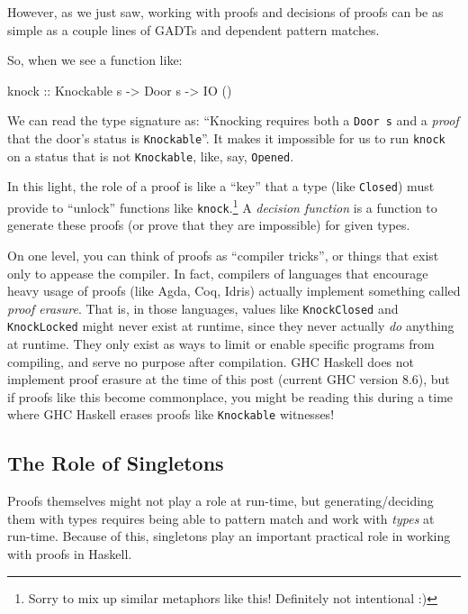 \documentclass[]{article}
\newenvironment{Shaded}{}{}
\newcommand{\DataTypeTok}[1]{\textcolor[rgb]{0.56,0.13,0.00}{#1}}
\newcommand{\NormalTok}[1]{#1}
\newcommand{\OtherTok}[1]{\textcolor[rgb]{0.00,0.44,0.13}{#1}}
\begin{document}
However, as we just saw, working with proofs and decisions of proofs can be as
simple as a couple lines of GADTs and dependent pattern matches.

So, when we see a function like:

\begin{Shaded}
\begin{Highlighting}[]
\OtherTok{knock ::} \DataTypeTok{Knockable}\NormalTok{ s }\OtherTok{->} \DataTypeTok{Door}\NormalTok{ s }\OtherTok{->} \DataTypeTok{IO}\NormalTok{ ()}
\end{Highlighting}
\end{Shaded}

We can read the type signature as: ``Knocking requires both a \texttt{Door\ s}
and a \emph{proof} that the door's status is \texttt{Knockable}''. It makes it
impossible for us to run \texttt{knock} on a status that is not
\texttt{Knockable}, like, say, \texttt{\textquotesingle{}Opened}.

In this light, the role of a proof is like a ``key'' that a type (like
\texttt{\textquotesingle{}Closed}) must provide to ``unlock'' functions like
\texttt{knock}.\footnote{Sorry to mix up similar metaphors like this! Definitely
  not intentional :)} A \emph{decision function} is a function to generate these
proofs (or prove that they are impossible) for given types.

On one level, you can think of proofs as ``compiler tricks'', or things that
exist only to appease the compiler. In fact, compilers of languages that
encourage heavy usage of proofs (like Agda, Coq, Idris) actually implement
something called \emph{proof erasure}. That is, in those languages, values like
\texttt{KnockClosed} and \texttt{KnockLocked} might never exist at runtime,
since they never actually \emph{do} anything at runtime. They only exist as ways
to limit or enable specific programs from compiling, and serve no purpose after
compilation. GHC Haskell does not implement proof erasure at the time of this
post (current GHC version 8.6), but if proofs like this become commonplace, you
might be reading this during a time where GHC Haskell erases proofs like
\texttt{Knockable} witnesses!

\hypertarget{the-role-of-singletons}{%
\subsection{The Role of Singletons}\label{the-role-of-singletons}}

Proofs themselves might not play a role at run-time, but generating/deciding
them with types requires being able to pattern match and work with \emph{types}
at run-time. Because of this, singletons play an important practical role in
working with proofs in Haskell.
\end{document}
